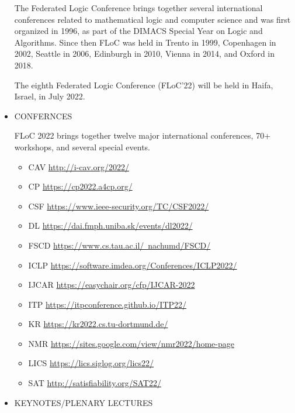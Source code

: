 \documentclass[prodmode,acmtecs]{acmsmall} %
\begin{document}
\begin{itemize}
  The Federated Logic Conference brings together several international conferences related to mathematical logic and computer science and was first organized in 1996, as part of the DIMACS Special Year on Logic and Algorithms. Since then FLoC was held in Trento in 1999, Copenhagen in 2002, Seattle in 2006, Edinburgh in 2010, Vienna in 2014, and Oxford in 2018. 
 
  The eighth Federated Logic Conference (FLoC'22) will be held in Haifa, Israel, in July 2022. 
 
\item  CONFERNCES 
 
  FLoC 2022 brings together twelve major international conferences, 70+ workshops, and several special events. 
 
\begin{itemize}\item  CAV \href{http://i-cav.org/2022/}{http://i-cav.org/2022/}
\item  CP \href{https://cp2022.a4cp.org/}{https://cp2022.a4cp.org/}
\item  CSF \href{https://www.ieee-security.org/TC/CSF2022/}{https://www.ieee-security.org/TC/CSF2022/}
\item  DL \href{https://dai.fmph.uniba.sk/events/dl2022/}{https://dai.fmph.uniba.sk/events/dl2022/}
\item  FSCD \href{https://www.cs.tau.ac.il/~nachumd/FSCD/}{https://www.cs.tau.ac.il/~nachumd/FSCD/}
\item  ICLP \href{https://software.imdea.org/Conferences/ICLP2022/}{https://software.imdea.org/Conferences/ICLP2022/}
\item  IJCAR \href{https://easychair.org/cfp/IJCAR-2022}{https://easychair.org/cfp/IJCAR-2022}
\item  ITP \href{https://itpconference.github.io/ITP22/}{https://itpconference.github.io/ITP22/}
\item  KR \href{https://kr2022.cs.tu-dortmund.de/}{https://kr2022.cs.tu-dortmund.de/}
\item  NMR \href{https://sites.google.com/view/nmr2022/home-page}{https://sites.google.com/view/nmr2022/home-page}
\item  LICS \href{https://lics.siglog.org/lics22/}{https://lics.siglog.org/lics22/}
\item  SAT \href{http://satisfiability.org/SAT22/}{http://satisfiability.org/SAT22/}
\end{itemize} 
\item  KEYNOTES/PLENARY LECTURES 
 

\end{itemize}
\end{document}
